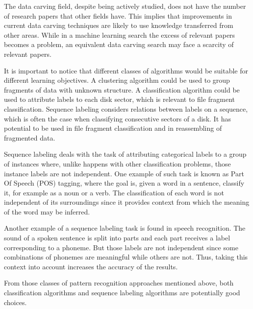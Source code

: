 The data carving field, despite being actively studied, does not have the number of research papers that other fields have. This implies that improvements in current data carving techniques are likely to use knowledge transferred from other areas. While in a machine learning search the excess of relevant papers becomes a problem, an equivalent data carving search may face a scarcity of relevant papers.

It is important to notice that different classes of algorithms would be suitable for different learning objectives.
A clustering algorithm could be used to group fragments of data with unknown structure.
A classification algorithm could be used to attribute labels to each disk sector, which is relevant to file fragment classification. 
Sequence labeling considers relations between labels on a sequence, which is often the case when classifying consecutive sectors of a disk. It has potential to be used in file fragment classification and in reassembling of fragmented data.

Sequence labeling deals with the task of attributing categorical labels to a group of instances where, unlike happens with other classification problems, those instance labels are not independent.
One example of such task is known as Part Of Speech (POS) tagging, where the goal is, given a word in a sentence, classify it, for example as a noun or a verb.
The classification of each word is not independent of its surroundings since it provides context from which the meaning of the word may be inferred.

Another example of a sequence labeling task is found in speech recognition.
The sound of a spoken sentence is split into parts and each part receives a label corresponding to a phoneme. But those labels are not independent since some combinations of phonemes are meaningful while others are not. Thus, taking this context into account increases the accuracy of the results.

From those classes of pattern recognition approaches mentioned above, both classification algorithms and sequence labeling algorithms are potentially good choices.
